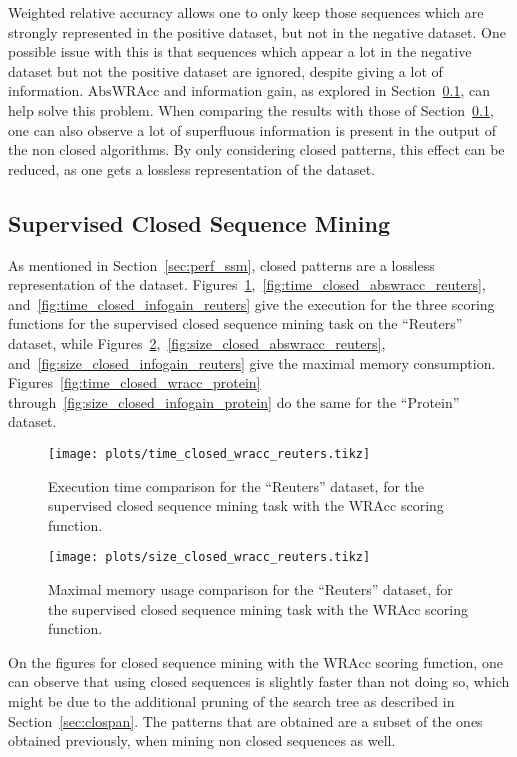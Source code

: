 \documentclass{sigkddExp}
\newcommand{\wracc}{\mathrm{WRAcc}}
\newcommand{\abswracc}{\mathrm{AbsWRAcc}}
\begin{document}
Weighted relative accuracy allows one to only keep those sequences which are strongly represented in the positive dataset, but not in the negative dataset.
One possible issue with this is that sequences which appear a lot in the negative dataset but not the positive dataset are ignored, despite giving a lot of information.
\(\abswracc\) and information gain, as explored in Section~\ref{sec:perf_scsm}, can help solve this problem.
When comparing the results with those of Section~\ref{sec:perf_scsm}, one can also observe a lot of superfluous information is present in the output of the non closed algorithms.
By only considering closed patterns, this effect can be reduced, as one gets a lossless representation of the dataset.
\subsection{Supervised Closed Sequence Mining}
\label{sec:perf_scsm}
As mentioned in Section~\ref{sec:perf_ssm}, closed patterns are a lossless representation of the dataset.
Figures~\ref{fig:time_closed_wracc_reuters},~\ref{fig:time_closed_abswracc_reuters}, and~\ref{fig:time_closed_infogain_reuters} give the execution for the three scoring functions for the supervised closed sequence mining task on the ``Reuters'' dataset, while Figures~\ref{fig:size_closed_wracc_reuters},~\ref{fig:size_closed_abswracc_reuters}, and~\ref{fig:size_closed_infogain_reuters} give the maximal memory consumption.
Figures~\ref{fig:time_closed_wracc_protein} through~\ref{fig:size_closed_infogain_protein} do the same for the ``Protein'' dataset.
\begin{figure}[!hbtp]
	\centering
	\texttt{[image: plots/time\_closed\_wracc\_reuters.tikz]}
	\caption{Execution time comparison for the ``Reuters'' dataset, for the supervised closed sequence mining task with the \(\wracc\) scoring function.}
	\label{fig:time_closed_wracc_reuters}
\end{figure}%
\begin{figure}[!hbtp]
	\centering
	\texttt{[image: plots/size\_closed\_wracc\_reuters.tikz]}
	\caption{Maximal memory usage comparison for the ``Reuters'' dataset, for the supervised closed sequence mining task with the \(\wracc\) scoring function.}
	\label{fig:size_closed_wracc_reuters}
\end{figure}
On the figures for closed sequence mining with the \(\wracc\) scoring function, one can observe that using closed sequences is slightly faster than not doing so, which might be due to the additional pruning of the search tree as described in Section~\ref{sec:clospan}.
The patterns that are obtained are a subset of the ones obtained previously, when mining non closed sequences as well.
\end{document}
